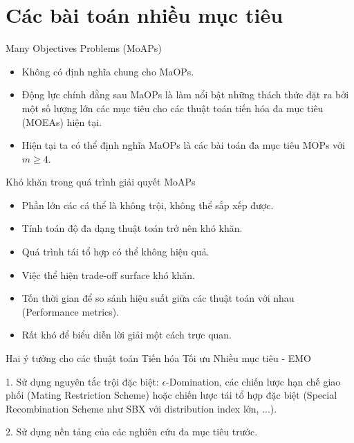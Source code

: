 \documentclass{beamer}
\begin{document}

\section{Các bài toán nhiều mục tiêu}

    \begin{frame}{Many Objectives Problems (MoAPs)}
        \begin{itemize}
            \item <1-> Không có định nghĩa chung cho MaOPs.
            \item <2-> Động lực chính đằng sau MaOPs là làm nổi bật những thách thức đặt ra bởi một số lượng lớn các mục tiêu cho các thuật toán tiến hóa đa mục tiêu (MOEAs) hiện tại.
            \item <3-> Hiện tại ta có thể định nghĩa MaOPs là các bài toán đa mục tiêu MOPs với $m \geq 4$.
        \end{itemize}
    \end{frame}

    \begin{frame}{Khó khăn trong quá trình giải quyết MoAPs}
        \begin{itemize}
            \item <1-> Phần lớn các cá thể là không trội, không thể sắp xếp được.
            \item <2-> Tính toán độ đa dạng thuật toán trở nên khó khăn.
            \item <3-> Quá trình tái tổ hợp có thể không hiệu quả.
            \item <4-> Việc thể hiện trade-off surface khó khăn.
            \item <5-> Tốn thời gian để so sánh hiệu suất giữa các thuật toán với nhau (Performance metrics).
            \item <6-> Rất khó để biểu diễn lời giải một cách trực quan.
        \end{itemize}
    \end{frame}

    \begin{frame}{Hai ý tưởng cho các thuật toán Tiến hóa Tối ưu Nhiều mục tiêu - EMO}
        \begin{block}{1.}
            Sử dụng nguyên tắc trội đặc biệt: $ \epsilon $-Domination, các chiến lược hạn chế giao phối (Mating Restriction Scheme)
            hoặc chiến lược tái tổ hợp đặc biệt (Special Recombination Scheme như SBX với distribution index lớn, ...).
        \end{block}
        \pause
        \begin{block}{2.}
            Sử dụng nền tảng của các nghiên cứu đa mục tiêu trước.
        \end{block}
    \end{frame}
    
\end{document}
